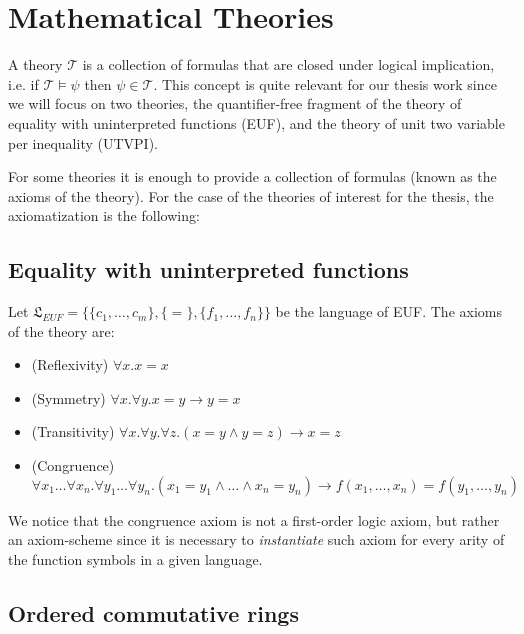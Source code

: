 \section{Mathematical Theories} \label{math_theories}

A theory $\mathcal{T}$ is a collection of formulas that are closed under logical implication, i.e. if $\mathcal{T} \models \psi$ then $\psi \in \mathcal{T}$. This concept is quite relevant for our thesis work since we will focus on two theories, the quantifier-free fragment of the theory of equality with uninterpreted functions (EUF), and the theory of unit two variable per inequality (UTVPI). 

For some theories it is enough to provide a collection of formulas (known as the axioms of the theory). For the case of the theories of interest for the thesis, the axiomatization is the following:

\subsection{Equality with uninterpreted functions}

\begin{definition} \label{euf_axioms}
  Let $\mathfrak{L}_{EUF} = \{ \{c_1, \dots, c_m \}, \{ = \}, \{ f_1, \dots, f_n \} \}$ be the language of EUF. The axioms of the theory are:
  \begin{itemize}
    \item (Reflexivity) $\forall x . x = x$
    \item (Symmetry) $\forall x . \forall y . x = y \rightarrow y = x$
    \item (Transitivity) $\forall x . \forall y . \forall z. (x = y \land y = z) \rightarrow x = z$
    \item (Congruence) $\forall x_1  \dots \forall x_n . \forall y_1 \dots \forall y_n . (x_1 = y_1 \land \dots \land x_n = y_n) \rightarrow f(x_1, \dots, x_n) = f(y_1, \dots, y_n) $
  \end{itemize}
\end{definition}

We notice that the congruence axiom is not a first-order logic axiom, but rather an axiom-scheme since it is necessary to \emph{instantiate} such axiom for every arity of the function symbols in a given language.

\subsection{Ordered commutative rings}

